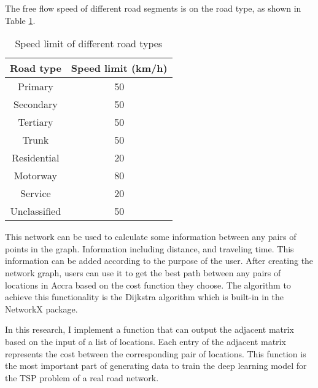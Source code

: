 \documentclass[final-report]{report-template}
\begin{document}
The free flow speed of different road segments is on the road type, as shown in Table \ref{tab:speed_limit}.
\begin{table}[H]
    \centering
    \begin{tabular}{|c|c|}
    \hline
    Road type & Speed limit (km/h) \\
    \hline
    Primary & 50 \\
    Secondary & 50 \\
    Tertiary & 50 \\
    Trunk & 50 \\
    Residential & 20 \\
    Motorway & 80 \\
    Service & 20 \\
    Unclassified & 50 \\
    \hline
    \end{tabular}
    \caption{\label{tab:speed_limit}Speed limit of different road types}
\end{table}
    
This network can be used to calculate some information between any pairs of points in the graph.
Information including distance, and traveling time. This information can be added according to the purpose of the user.
After creating the network graph, users can use it to get the best path between any pairs of locations in Accra based on the cost function they choose.
The algorithm to achieve this functionality is the Dijkstra algorithm which is built-in in the NetworkX package.

In this research, I implement a function that can output the adjacent matrix based on the input of a list of locations.
Each entry of the adjacent matrix represents the cost between the corresponding pair of locations. 
This function is the most important part of generating data to train the deep learning model for the TSP problem of a real road network.
\end{document}
